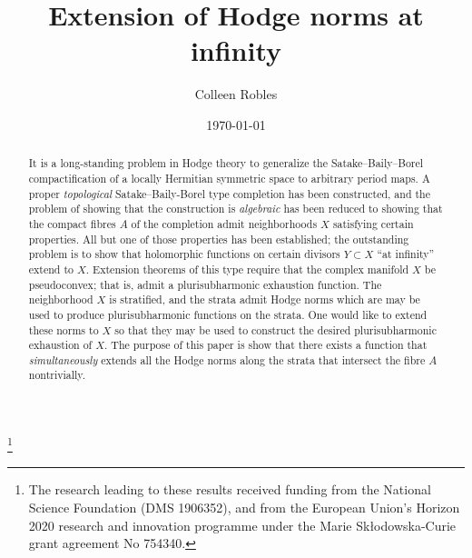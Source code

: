 \documentclass[12pt]{amsart}
\numberwithin{equation}{section}
\numberwithin{table}{section}
\theoremstyle{definition}
\theoremstyle{definition}
\theoremstyle{remark}
\begin{document}
\title{Extension of Hodge norms at infinity}



\author[Robles]{Colleen Robles}
\address{Mathematics Department, Duke University, Box 90320, Durham, NC  27708-0320} 
\thanks{The research leading to these results received funding from the National Science Foundation (DMS 1906352), and from the European Union's Horizon 2020 research and innovation programme under the Marie Sk\l{}odowska-Curie grant agreement No 754340.}

\date{\today}

\begin{abstract}
It is a long-standing problem in Hodge theory to generalize the Satake--Baily--Borel compactification of a locally Hermitian symmetric space to arbitrary period maps.  A proper \emph{topological} Satake--Baily-Borel type completion has been constructed, and the problem of showing that the construction is \emph{algebraic} has been reduced to showing that the compact fibres $A$ of the completion admit neighborhoods $X$ satisfying certain properties.  All but one of those properties has been established; the outstanding problem is to show that holomorphic functions on certain divisors $Y \subset X$ ``at infinity'' extend to $X$.  Extension theorems of this type require that the complex manifold $X$ be pseudoconvex; that is, admit a plurisubharmonic exhaustion function.  The neighborhood $X$ is stratified, and the strata admit Hodge norms which are may be used to produce plurisubharmonic functions on the strata.  One would like to extend these norms to $X$ so that they may be used to construct  the desired plurisubharmonic exhaustion of $X$.  The purpose of this paper is show that there exists a function that \emph{simultaneously} extends all the Hodge norms along the strata that intersect the fibre $A$ nontrivially.
\end{abstract}
\maketitle
\end{document}
